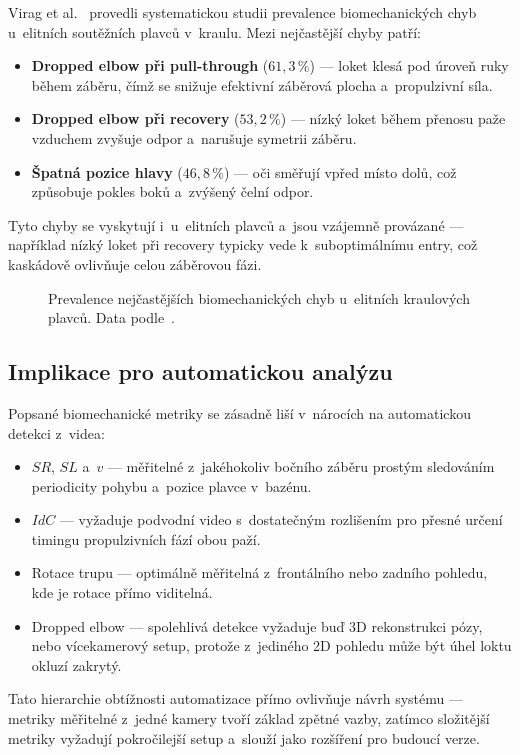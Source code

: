 Virag et al.~\cite{virag2014} provedli systematickou studii prevalence biomechanických chyb u~elitních soutěžních plavců v~kraulu. Mezi nejčastější chyby patří:
\begin{itemize}
    \item \textbf{Dropped elbow při pull-through} ($61{,}3\,\%$) --- loket klesá pod úroveň ruky během záběru, čímž se snižuje efektivní záběrová plocha a~propulzivní síla.
    \item \textbf{Dropped elbow při recovery} ($53{,}2\,\%$) --- nízký loket během přenosu paže vzduchem zvyšuje odpor a~narušuje symetrii záběru.
    \item \textbf{Špatná pozice hlavy} ($46{,}8\,\%$) --- oči směřují vpřed místo dolů, což způsobuje pokles boků a~zvýšený čelní odpor.
\end{itemize}
Tyto chyby se vyskytují i~u~elitních plavců a~jsou vzájemně provázané --- například nízký loket při recovery typicky vede k~suboptimálnímu entry, což kaskádově ovlivňuje celou záběrovou fázi.

\begin{figure}[htbp]
    \centering
    
    \caption{Prevalence nejčastějších biomechanických chyb u~elitních kraulových plavců. Data podle~\cite{virag2014}.}
    \label{fig:biomech_errors}
\end{figure}

\subsection{Implikace pro automatickou analýzu}
\label{subsec:implikace_automaticka_analyza}

Popsané biomechanické metriky se zásadně liší v~nárocích na automatickou detekci z~videa:
\begin{itemize}
    \item $SR$, $SL$ a~$v$ --- měřitelné z~jakéhokoliv bočního záběru prostým sledováním periodicity pohybu a~pozice plavce v~bazénu.
    \item $IdC$ --- vyžaduje podvodní video s~dostatečným rozlišením pro přesné určení timingu propulzivních fází obou paží.
    \item Rotace trupu --- optimálně měřitelná z~frontálního nebo zadního pohledu, kde je rotace přímo viditelná.
    \item Dropped elbow --- spolehlivá detekce vyžaduje buď 3D rekonstrukci pózy, nebo vícekamerový setup, protože z~jediného 2D pohledu může být úhel loktu okluzí zakrytý.
\end{itemize}
Tato hierarchie obtížnosti automatizace přímo ovlivňuje návrh systému --- metriky měřitelné z~jedné kamery tvoří základ zpětné vazby, zatímco složitější metriky vyžadují pokročilejší setup a~slouží jako rozšíření pro budoucí verze.

